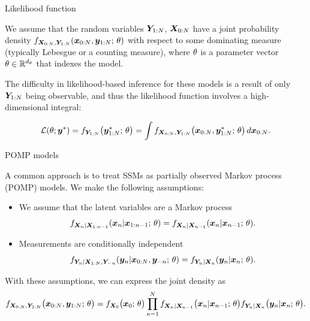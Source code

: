 \documentclass[aspectratio=169]{beamer}\usepackage[]{graphicx}\usepackage[]{xcolor}
\begin{document}
\begin{frame}{Likelihood function}

  We assume that the random variables $\bm{Y}_{{1}:{N}}$, $\bm{X}_{{0}:{N}}$ have a joint probability density $f_{\bm{X}_{{0}:{N}}, \bm{Y}_{{1}:{N}}}(\bm{x}_{{0}:{N}}, \bm{y}_{{1}:{N}}; \, \theta)$ with respect to some dominating measure (typically Lebesgue or a counting measure), where $\theta$ is a parameter vector $\theta \in \mathbb{R}^{d_\theta}$ that indexes the model.
  
  The difficulty in likelihood-based inference for these models is a result of only $\bm{Y}_{{1}:{N}}$ being observable, and thus the likelihood function involves a high-dimensional integral: 
  
\begin{eqnarray}
  \label{eq:likedef}
  \mathcal{L}(\theta; \bm{y}^*) = f_{\bm{Y}_{1:N}}\big(\bm{y}_{1:N}^*; \, \theta\big) = \int f_{\bm{X}_{{0}:{N}}, \bm{Y}_{{1}:{N}}}\big(\bm{x}_{{0}:{N}}, \bm{y}_{{1}:{N}}^*;\, \theta\big) \, d\bm{x}_{{0}:{N}}.
\end{eqnarray}

\end{frame}

\begin{frame}{POMP models}

A common approach is to treat SSMs as partially observed Markov process (POMP) models. We make the following assumptions: 
\begin{itemize}
  \item We assume that the latent variables are a Markov process
  $$
  f_{\bm{X}_{n} | \bm{X}_{1:n-1}}(\bm{x}_{n} | \bm{x}_{1:n-1}; \, \theta) = f_{\bm{X}_{n} | \bm{X}_{n-1}}(\bm{x}_{n} | \bm{x}_{n-1}; \, \theta).
  $$
  \item Measurements are conditionally independent
  $$
  f_{\bm{Y}_{n} | \bm{X}_{1:N}, \bm{Y}_{-n}}(\bm{y}_{n} | \bm{x}_{0:N}, \bm{y}_{-n}; \, \theta) = f_{\bm{Y}_{n} | \bm{X}_{n}}(\bm{y}_{n} | \bm{x}_{n}; \, \theta).
  $$
\end{itemize}
With these assumptions, we can express the joint density as
\begin{eqnarray}
\label{eq:jointLik}
f_{\bm{X}_{0:N}, \bm{Y}_{1:N}}\big(\bm{x}_{0:N}, \bm{y}_{1:N};\, \theta\big) = f_{\bm{X}_0}\big(\bm{x}_0;\, \theta\big)\prod_{n = 1}^N f_{\bm{X}_n|\bm{X}_{n-1}}\big(\bm{x}_{n}|\bm{x}_{n-1}; \, \theta\big)f_{\bm{Y}_n|\bm{X}_{n}}\big(\bm{y}_n|\bm{x}_{n}; \, \theta\big).
\end{eqnarray}

\end{frame}
\end{document}
